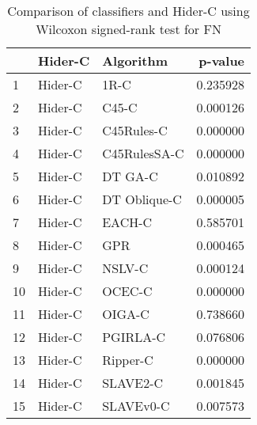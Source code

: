 \begin{table}
\footnotesize
\caption{Comparison of classifiers and Hider-C using Wilcoxon signed-rank test for FN}
\label{tab:Hider-C wilcoxon FN comparison}
\begin{tabular}{lllr}
\hline
 & Hider-C & Algorithm & p-value \\
\hline
1 & Hider-C & 1R-C & 0.235928 \\
2 & Hider-C & C45-C & 0.000126 \\
3 & Hider-C & C45Rules-C & 0.000000 \\
4 & Hider-C & C45RulesSA-C & 0.000000 \\
5 & Hider-C & DT GA-C & 0.010892 \\
6 & Hider-C & DT Oblique-C & 0.000005 \\
7 & Hider-C & EACH-C & 0.585701 \\
8 & Hider-C & GPR & 0.000465 \\
9 & Hider-C & NSLV-C & 0.000124 \\
10 & Hider-C & OCEC-C & 0.000000 \\
11 & Hider-C & OIGA-C & 0.738660 \\
12 & Hider-C & PGIRLA-C & 0.076806 \\
13 & Hider-C & Ripper-C & 0.000000 \\
14 & Hider-C & SLAVE2-C & 0.001845 \\
15 & Hider-C & SLAVEv0-C & 0.007573 \\
\hline
\end{tabular}
\end{table}
